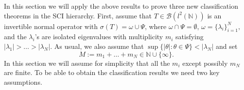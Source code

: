 \documentclass[a4paper,10pt]{article}
\begin{document}
In this section we will apply the above results to prove three new classification theorems in the SCI hierarchy. First, assume that $T \in \mathcal{B}(l^2(\mathbb{N}))$ is an invertible normal operator with $\sigma(T) = \omega \cup \Psi$, where $\omega \cap \Psi = \emptyset$, $\omega = \{\lambda_i\}_{i=1}^N,$ and the $\lambda_i$'s are isolated eigenvalues with multiplicity $m_i$ satisfying $|\lambda_1| > \hdots > |\lambda_N|.$ As usual, we also assume that $\sup\{|\theta|:\theta \in \Psi\} < |\lambda_N|$ and set 
\begin{equation}\label{eq:the_M}
M := m_1 + \hdots +m_N\in\mathbb{N}\cup\{\infty\}. 
\end{equation}
In this section we will assume for simplicity that all the $m_i$ except possibly $m_N$ are finite.
To be able to obtain the classification results we need two key assumptions.
\end{document}
